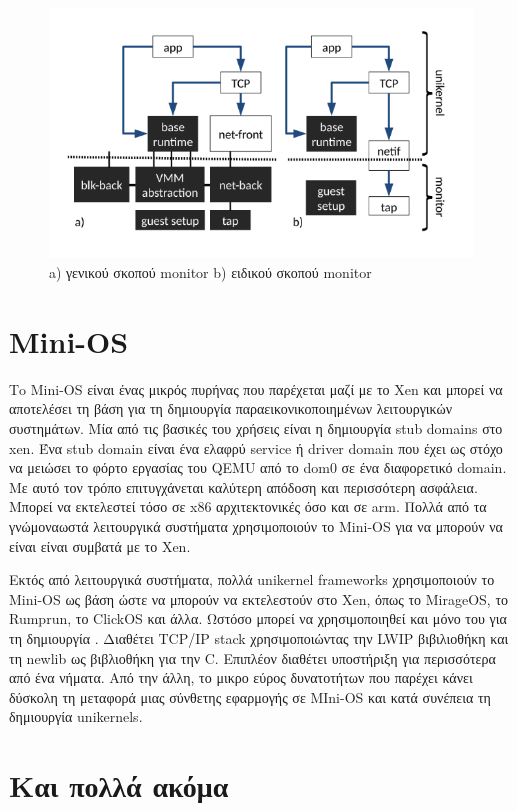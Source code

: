 \begin{figure}[htp]
\centering
\includegraphics[scale=0.6]{figures/solo5.png}
\caption{a) γενικού σκοπού monitor b) ειδικού σκοπού monitor\label{fig3_8}}
\end{figure}

\section{Mini-OS}

Τo Mini-OS είναι ένας μικρός πυρήνας που παρέχεται μαζί με το Xen και μπορεί να
αποτελέσει τη βάση για τη δημιουργία παραεικονικοποιημένων λειτουργικών
συστημάτων. Μία από τις βασικές του χρήσεις είναι η δημιουργία stub domains στο
xen. Ένα stub domain είναι ένα ελαφρύ service ή driver domain που έχει ως στόχο
να μειώσει το φόρτο εργασίας του QEMU από το dom0 σε ένα διαφορετικό domain. Με
αυτό τον τρόπο επιτυγχάνεται καλύτερη απόδοση και περισσότερη ασφάλεια. Μπορεί
να εκτελεστεί τόσο σε x86 αρχιτεκτονικές όσο και σε arm. Πολλά από τα
γνώμοναωστά λειτουργικά συστήματα χρησιμοποιούν το Mini-OS για να μπορούν να
είναι είναι συμβατά με το Xen.

Εκτός από λειτουργικά συστήματα, πολλά unikernel frameworks χρησιμοποιούν το
Mini-OS ως βάση ώστε να μπορούν να εκτελεστούν στο Xen, όπως το MirageOS, το
Rumprun, το ClickOS και άλλα. Ωστόσο  μπορεί να χρησιμοποιηθεί και μόνο του για
τη δημιουργία . Διαθέτει TCP/IP stack χρησιμοποιώντας την LWIP
βιβιλιοθήκη και τη newlib ως βιβλιοθήκη για την C. Επιπλέον διαθέτει υποστήριξη
για περισσότερα από ένα νήματα. Από την άλλη, το μικρο εύρος δυνατοτήτων που
παρέχει κάνει δύσκολη τη μεταφορά μιας σύνθετης εφαρμογής σε MIni-OS και κατά
συνέπεια τη δημιουργία unikernels.

\section{Και πολλά ακόμα}

